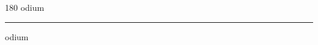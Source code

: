 
\begin{frame}
\begin{center}
\begin{turn}{180}
{\fontsize{2.5cm}{1em}\selectfont odium}
\end{turn}
\vspace{1em}\par  
\hrule
\vspace{1em}\par  
{\fontsize{2.5cm}{1em}\selectfont odium}
\end{center}
\end{frame}
